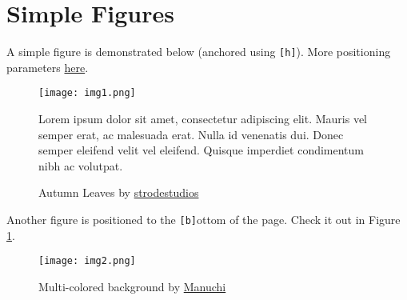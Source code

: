 
\section{Simple Figures}

A simple figure is demonstrated below (anchored using \texttt{[h]}). More positioning parameters \href{https://www.overleaf.com/learn/latex/Inserting_Images#Positioning}{here}.

\begin{figure}[h]
    \centering
    \texttt{[image: img1.png]}
    \caption[Autumn Leaves]{Autumn Leaves by \href{https://pixabay.com/vectors/leaves-autumn-pattern-background-5598709/}{strodestudios}}
    \small
        Lorem ipsum dolor sit amet, consectetur adipiscing elit. Mauris vel semper erat, ac malesuada erat. Nulla id venenatis dui. Donec semper eleifend velit vel eleifend. Quisque imperdiet condimentum nibh ac volutpat.
\end{figure}

Another figure is positioned to the \texttt{[b]}ottom of the page. Check it out in Figure \ref{fig:mcb-bottom}.

\begin{figure}[b]
    \centering
    \texttt{[image: img2.png]}
    \caption[Multi-colored background]{Multi-colored background by \href{https://pixabay.com/illustrations/colorful-rainbow-gradient-geometric-2174045/}{Manuchi}}
    \label{fig:mcb-bottom}
\end{figure}
